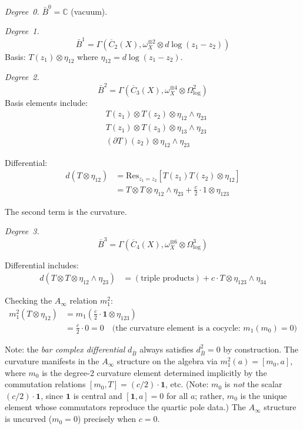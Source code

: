 \begin{computation}
\emph{Degree~0.} $\bar{B}^0 = \mathbb{C}$ (vacuum).

\emph{Degree~1.}
\begin{equation}
\bar{B}^1 = \Gamma(\overline{C}_2(X), \omega_X^{\otimes 2} \otimes d\log(z_1-z_2))
\end{equation}
Basis: $T(z_1) \otimes \eta_{12}$ where $\eta_{12} = d\log(z_1-z_2)$.

\emph{Degree~2.}
\begin{equation}
\bar{B}^2 = \Gamma(\overline{C}_3(X), \omega_X^{\otimes 4} \otimes \Omega^2_{\log})
\end{equation}
Basis elements include:
\begin{align}
&T(z_1) \otimes T(z_2) \otimes \eta_{12} \wedge \eta_{23} \\
&T(z_1) \otimes T(z_3) \otimes \eta_{13} \wedge \eta_{23} \\
&(\partial T)(z_2) \otimes \eta_{12} \wedge \eta_{23}
\end{align}

Differential:
\begin{align}
d(T \otimes \eta_{12}) &= \mathrm{Res}_{z_1=z_2}[T(z_1)T(z_2) \otimes \eta_{12}] \\
&= T \otimes T \otimes \eta_{12} \wedge \eta_{23} + \frac{c}{2} \cdot 1 \otimes \eta_{123}
\end{align}

The second term is the curvature.

\emph{Degree~3.}
\begin{equation}
\bar{B}^3 = \Gamma(\overline{C}_4(X), \omega_X^{\otimes 6} \otimes \Omega^3_{\log})
\end{equation}

Differential includes:
\begin{align}
d(T \otimes T \otimes \eta_{12} \wedge \eta_{23}) &= (\text{triple products}) + c \cdot T \otimes \eta_{123} \wedge \eta_{34}
\end{align}

Checking the $A_\infty$ relation $m_1^2$:
\begin{align}
m_1^2(T \otimes \eta_{12}) &= m_1\!\left(\frac{c}{2} \cdot \mathbf{1} \otimes \eta_{123}\right) \\
&= \frac{c}{2} \cdot 0 = 0 \quad \text{(the curvature element is a cocycle: } m_1(m_0) = 0\text{)}
\end{align}

Note: the \emph{bar complex differential} $d_{\bar{B}}$ always satisfies $d_{\bar{B}}^2 = 0$ by construction.  The curvature manifests in the $A_\infty$ structure on the algebra via $m_1^2(a) = [m_0, a]$, where $m_0$ is the degree-2 curvature element determined implicitly by the commutation relations $[m_0, T] = (c/2)\cdot\mathbf{1}$, etc.  (Note: $m_0$ is \emph{not} the scalar $(c/2)\cdot\mathbf{1}$, since $\mathbf{1}$ is central and $[\mathbf{1}, a] = 0$ for all $a$; rather, $m_0$ is the unique element whose commutators reproduce the quartic pole data.)
The $A_\infty$ structure is uncurved ($m_0 = 0$) precisely when $c = 0$.
\end{computation}

